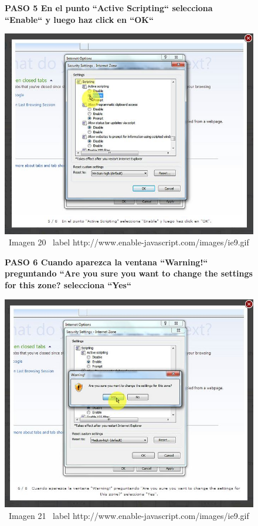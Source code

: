 \documentclass[11pt]{article} %
\begin{document}
\begin{figure}
\begin{center}

\begin{center}
\bf PASO 5
En el punto ``Active Scripting`` selecciona ``Enable`` y luego haz click en ``OK``
\end{center}
\includegraphics[height=8 cm, width=8 cm] {imagenes/explorer 05.jpg}
\newline
\newline
\ Imagen 20
\ label {http://www.enable-javascript.com/images/ie9.gif }
\newline

\begin{center}
\bf PASO 6
Cuando aparezca la ventana ``Warning!``  preguntando  ``Are you sure you want to change the settings for this zone?  selecciona ``Yes``
\end{center}
\includegraphics[height=8 cm, width=8 cm] {imagenes/explorer 06.jpg}
\newline
\newline
\ Imagen 21
\ label {http://www.enable-javascript.com/images/ie9.gif }

\end{center}
\end{figure}
\end{document}
